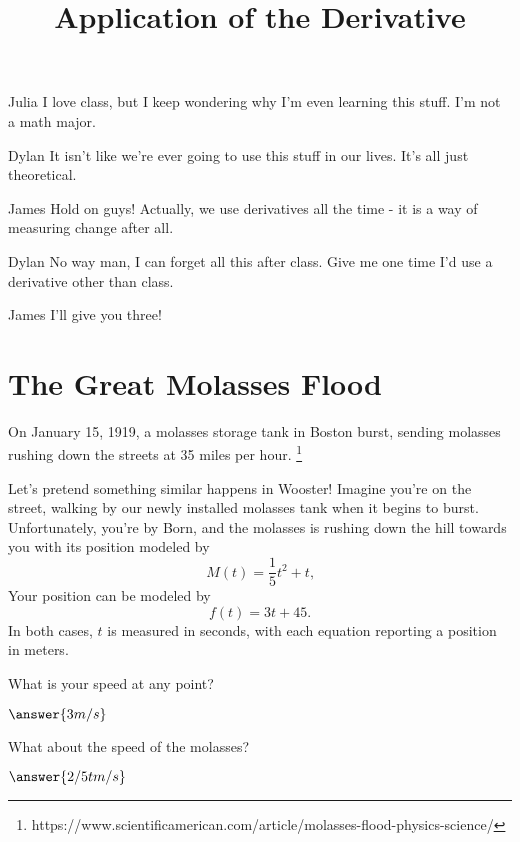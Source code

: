 \documentclass{ximera}
\title{Application of the Derivative}
\begin{document}
\maketitle
\begin{dialogue}
\item[Julia] I love class, but I keep wondering why I'm even learning this stuff. I'm not a math major.
\item[Dylan] It isn't like we're ever going to use this stuff in our lives. It's all just theoretical.
\item[James] Hold on guys! Actually, we use derivatives all the time - it is a way of measuring change after all.
\item[Dylan] No way man, I can forget all this after class. Give me one time I'd use a derivative other than class.
\item[James] I'll give you three!
\end{dialogue}
\section{The Great Molasses Flood}
On January 15, 1919, a molasses storage tank in Boston burst, sending molasses rushing down the streets at 35 miles per hour. \footnote{https://www.scientificamerican.com/article/molasses-flood-physics-science/}

Let's pretend something similar happens in Wooster! Imagine you're on the street, walking by our newly installed molasses tank when it begins to burst. Unfortunately, you're by Born, and the molasses is rushing down the hill towards you with its position modeled by $$M(t)=\frac{1}{5}t^2+t \text{,}$$ Your position can be modeled by $$f(t)=3t+45 \text{.}$$ In both cases, $t$ is measured in seconds, with each equation reporting a position in meters.

\setcounter{problem}{0}
\begin{question}
What is your speed at any point?

$\answer{3 m/s}$

What about the speed of the molasses?

$\answer{2/5 t m/s}$
\end{question}
\end{document}
